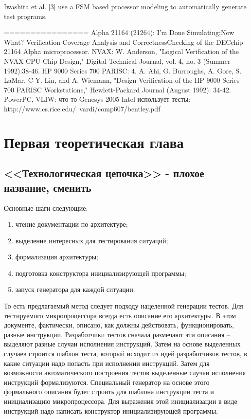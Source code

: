 \documentclass[14pt]{extreport}
\begin{document}
Iwashita et al. [3] use a FSM based processor modeling to automatically generate test programs.

================
Alpha 21164 (21264): I’m Done Simulating;Now What? Verification Coverage Analysis and CorrectnessChecking of the DECchip 21164 Alpha microprocessor.
NVAX: W. Anderson, "Logical Verification of the NVAX CPU Chip Design," Digital Technical Journal, vol. 4, no. 3 (Summer 1992):38-46.
HP 9000 Series 700 PARISC:  4. A. Ahi, G. Burroughs, A. Gore, S. LaMar, C-Y. Lin, and A. Wiemann, "Design Verification of the HP 9000 Series 700 PARISC Workstations," Hewlett-Packard Journal (August 1992): 34-42.
PowerPC, VLIW: что-то Genesys 2005
Intel использует тесты: http://www.cs.rice.edu/~vardi/comp607/bentley.pdf



\chapter{Первая теоретическая глава}

\section{<<Технологическая цепочка>> - плохое название, сменить}
Основные шаги следующие:
\begin{enumerate}
  \item чтение документации по архитектуре;
  \item выделение интересных для тестирования ситуаций;
  \item формализация архитектуры;
  \item подготовка конструктора инициализирующей программы;
  \item запуск генератора для каждой ситуации.
\end{enumerate}

То есть предлагаемый метод следует подходу нацеленной генерации тестов. Для
тестируемого микропроцессора всегда есть описание его архитектуры. В этом
документе, фактически, описано, как должны действовать, функционировать, разные
инструкции. Разработчики тестов сначала размечают эти описания -- выделяют
разные случаи исполнения инструкций. Затем на основе выделенных случаев строится
шаблон теста, который исходит из идей разработчиков тестов, в какие ситуации
надо попасть при исполнении инструкций. Затем для возможности автоматического
построения тестов выделенные случаи исполнения инструкций формализуются.
Специальный генератор на основе этого формального описания будет строить для
шаблона инструкции теста и инициализацию микропроцессора.
Для выражения этой инициализации в виде инструкций надо написать конструктор
инициализирующей программы.
\end{document}
